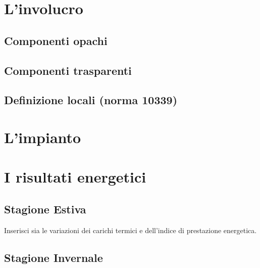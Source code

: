 \section{L'involucro}
\subsection{Componenti opachi}
\subsection{Componenti trasparenti}
\subsection{Definizione locali (norma 10339)}
\section{L'impianto}
\section{I risultati energetici}
\subsection{Stagione Estiva}
Inserisci sia le variazioni dei carichi termici e dell'indice di prestazione energetica.
\subsection{Stagione Invernale}
